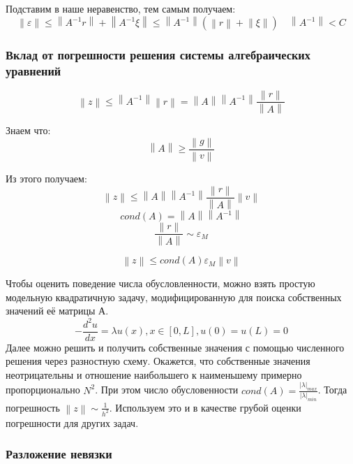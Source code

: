Подставим в наше неравенство, тем самым получаем:
\[
  \left\lVert \varepsilon \right\rVert \leq \left\lVert A^{-1}r \right\rVert + \left\lVert A^{-1}\xi \right\rVert
  \leq \left\lVert A^{-1} \right\rVert ( \left\lVert r \right\rVert  + \left\lVert \xi \right\rVert)
  \quad \left\lVert A^{-1}\right\rVert  < C
\]

\subsubsection{Вклад от погрешности решения системы алгебраических уравнений}
\[
  \left\lVert z \right\rVert \leq \left\lVert A^{-1} \right\rVert \left\lVert r \right\rVert =
  \left\lVert A \right\rVert \left\lVert A^{-1} \right\rVert \frac{\left\lVert r \right\rVert }{\left\lVert A \right\rVert } 
\]

Знаем что:
\[
  \left\lVert A \right\rVert \geq \frac{\left\lVert g \right\rVert }{\left\lVert v\right\rVert }
\]

Из этого получаем:
\[
  \left\lVert z \right\rVert \leq \left\lVert A \right\rVert \left\lVert A^{-1} \right\rVert
  \frac{\left\lVert r \right\rVert }{\left\lVert A \right\rVert } \left\lVert v \right\rVert 
\]
\[
  cond(A) = \left\lVert A \right\rVert \left\lVert A^{-1} \right\rVert
\]
\[
  \frac{\left\lVert r \right\rVert }{\left\lVert A \right\rVert } \sim \varepsilon_{M}
\]


\[
  \left\lVert z \right\rVert \leq cond(A) \varepsilon_{M} \left\lVert v \right\rVert 
\]

Чтобы оценить поведение числа обусловленности, можно взять простую модельную квадратичную задачу, модифицированную для поиска собственных значений её матрицы А.
\[
  -\frac{d^2u}{dx} = \lambda u(x), x \in [0, L], u(0) = u(L) = 0
\]
Далее можно решить и получить собственные значения с помощью численного решения через разностную схему. Окажется, что собственные значения неотрицательны и отношение наибольшего к наименьшему примерно пропорционально $ N^2 $. При этом число обусловенности \( cond(A) = \frac{|\lambda|_{max}}{|\lambda|_{min}} \). Тогда погрешность $ \left\lVert z \right\rVert \sim \frac{1}{h^2} $. Используем это и в качестве грубой оценки погрешности для других задач.

\subsubsection{Разложение невязки}

